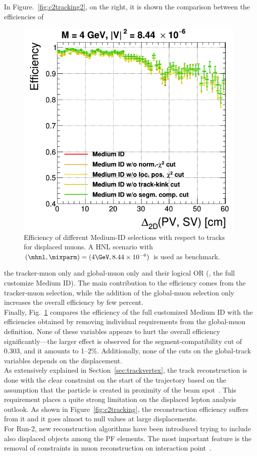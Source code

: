 In Figure.~\ref{fig:c2tracking2}, on the
right, it is shown
the comparison between the efficiencies of
\begin{figure}
\centering
\includegraphics[width=.4\textwidth]{Figures/c6/object/globalTrack_cuts_M-4_V-0p00290516780927_rho.png}
  \caption{Efficiency of different Medium-ID selections with respect to tracks for displaced
muons. A HNL scenario with
    $(\mhnl,\mixparm)=(4\GeV,8.44\times10^{-6})$ is used as
    benchmark. \dani}
  \label{fig:c2tracking3}
\end{figure} 
 the
tracker-muon only and global-muon only and their logical OR (\ie, the full
customize Medium ID). The main contribution to the efficiency comes
from the tracker-muon selection, while the addition of the global-muon
selection only increases the overall efficiency by few percent.\\
Finally, Fig.~\ref{fig:c2tracking3} compares the efficiency of
the full customized Medium ID with the efficiencies obtained by removing
individual requirements from the global-muon definition. None of these variables
appears to hurt the overall efficiency significantly---the larger
effect is observed for the segment-compatibility cut of 0.303, and it
amounts to 1--2\%. Additionally, none of the cuts on the global-track
variables depends on the displacement.\\

As extensively explained in Section~\ref{sec:trackvertex}, the track
reconstruction is done with the clear 
constraint on the start of the trajectory based on the assumption that the
particle is created in proximity of the beam
spot~\cite{Collaboration_2014_tracking}. This requirement places a
quite strong limitation on the displaced lepton analysis outlook. As
shown in Figure~\ref{fig:c2tracking}, the reconstruction efficiency
suffers from it and it goes almost to null values at large
displacements. \\
For Run-2, new reconstruction algorithms have been
introduced trying to include also displaced objects among
the PF elements. The most important feature is the removal of constraints in muon reconstruction
on interaction point~\cite{CMS-DP-2015-015, steven_slide}.

